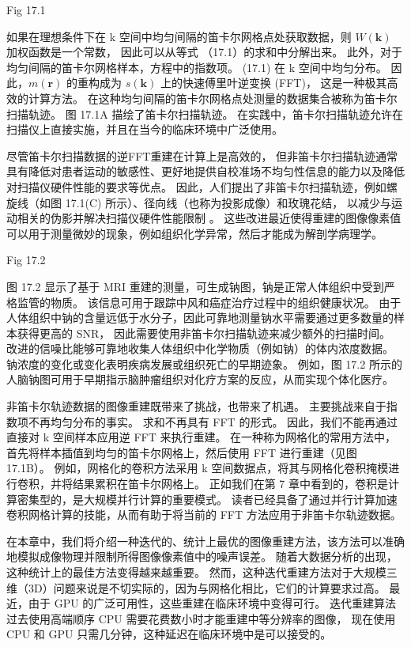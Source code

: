 {\color{red} Fig 17.1}

如果在理想条件下在 k 空间中均匀间隔的笛卡尔网格点处获取数据，则 $W(\mathbf{k})$ 加权函数是一个常数，
因此可以从等式 （17.1）的求和中分解出来。 此外，对于均匀间隔的笛卡尔网格样本，方程中的指数项。 
(17.1) 在 k 空间中均匀分布。 因此，$m(\mathbf{r})$ 的重构成为 $s(\mathbf{k})$ 上的快速傅里叶逆变换 (FFT)，
这是一种极其高效的计算方法。 在这种均匀间隔的笛卡尔网格点处测量的数据集合被称为笛卡尔扫描轨迹。 
图 17.1A 描绘了笛卡尔扫描轨迹。 在实践中，笛卡尔扫描轨迹允许在扫描仪上直接实施，并且在当今的临床环境中广泛使用。

尽管笛卡尔扫描数据的逆FFT重建在计算上是高效的，
但非笛卡尔扫描轨迹通常具有降低对患者运动的敏感性、更好地提供自校准场不均匀性信息的能力以及降低对扫描仪硬件性能的要求等优点。 
因此，人们提出了非笛卡尔扫描轨迹，例如螺旋线（如图 17.1(C) 所示）、径向线（也称为投影成像）和玫瑰花结，
以减少与运动相关的伪影并解决扫描仪硬件性能限制 。 
这些改进最近使得重建的图像像素值可以用于测量微妙的现象，例如组织化学异常，然后才能成为解剖学病理学。

{\color{red} Fig 17.2}

图 17.2 显示了基于 MRI 重建的测量，可生成钠图，钠是正常人体组织中受到严格监管的物质。 
该信息可用于跟踪中风和癌症治疗过程中的组织健康状况。 
由于人体组织中钠的含量远低于水分子，因此可靠地测量钠水平需要通过更多数量的样本获得更高的 SNR，
因此需要使用非笛卡尔扫描轨迹来减少额外的扫描时间。 
改进的信噪比能够可靠地收集人体组织中化学物质（例如钠）的体内浓度数据。 
钠浓度的变化或变化表明疾病发展或组织死亡的早期迹象。 
例如，图 17.2 所示的人脑钠图可用于早期指示脑肿瘤组织对化疗方案的反应，从而实现个体化医疗。

非笛卡尔轨迹数据的图像重建既带来了挑战，也带来了机遇。 主要挑战来自于指数项不再均匀分布的事实。 
求和不再具有 FFT 的形式。 因此，我们不能再通过直接对 k 空间样本应用逆 FFT 来执行重建。 
在一种称为网格化的常用方法中，首先将样本插值到均匀的笛卡尔网格上，然后使用 FFT 进行重建（见图 17.1B）。 
例如，网格化的卷积方法采用 k 空间数据点，将其与网格化卷积掩模进行卷积，并将结果累积在笛卡尔网格上。 
正如我们在第 7 章中看到的，卷积是计算密集型的，是大规模并行计算的重要模式。 
读者已经具备了通过并行计算加速卷积网格计算的技能，从而有助于将当前的 FFT 方法应用于非笛卡尔轨迹数据。

在本章中，我们将介绍一种迭代的、统计上最优的图像重建方法，该方法可以准确地模拟成像物理并限制所得图像像素值中的噪声误差。 
随着大数据分析的出现，这种统计上的最佳方法变得越来越重要。 
然而，这种迭代重建方法对于大规模三维（3D）问题来说是不切实际的，因为与网格化相比，它们的计算要求过高。 
最近，由于 GPU 的广泛可用性，这些重建在临床环境中变得可行。 
迭代重建算法过去使用高端顺序 CPU 需要花费数小时才能重建中等分辨率的图像，
现在使用 CPU 和 GPU 只需几分钟，这种延迟在临床环境中是可以接受的。

